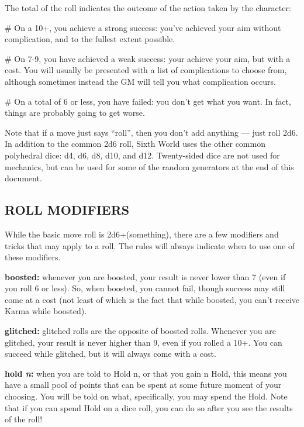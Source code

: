 
The total of the roll indicates the outcome of the action taken by the character:

\begin{easylist}
# On a 10+, you achieve a strong success: you've achieved your aim without complication, and to the fullest extent possible.

# On 7-9, you have achieved a weak success: your achieve your aim, but with a cost. You will usually be presented with a list of complications to choose from, although sometimes instead the GM will tell you what complication occurs.

# On a total of 6 or less, you have failed: you don’t get what you want. In fact, things are probably going to get worse.
\end{easylist}

Note that if a move just says ``roll'', then you don’t add anything — just roll 2d6. In addition to the common 2d6 roll, Sixth World uses the other common polyhedral dice: d4, d6, d8, d10, and d12. Twenty-sided dice are not used for mechanics, but can be used for some of the random generators at the end of this document.


\subsection{ROLL MODIFIERS}
While the basic move roll is 2d6+(something), there are a few modifiers and tricks that may apply to a roll. The rules will always indicate when to use one of these modifiers.

\textbf{boosted:} whenever you are boosted, your result is never lower than 7 (even if you roll 6 or less). So, when boosted, you cannot fail, though success may still come at a cost (not least of which is the fact that while boosted, you can’t receive Karma while boosted).

\textbf{glitched:} glitched rolls are the opposite of boosted rolls. Whenever you are glitched, your result is never higher than 9, even if you rolled a 10+. You can succeed while glitched, but it will always come with a cost.

\textbf{hold \textit{n}:} when you are told to Hold n, or that you gain n Hold, this means you have a small pool of points that can be spent at some future moment of your choosing. You will be told on what, specifically, you may spend the Hold. Note that if you can spend Hold on a dice roll, you can do so after you see the results of the roll!


